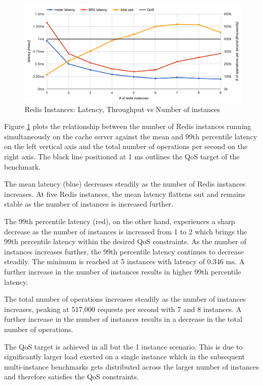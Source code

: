 \begin{figure}[h]
    \includegraphics[width=\textwidth]{./res/6_instances_latency_ops.png}
    \caption{Redis Instances: Latency, Throughput vs Number of instances}
    \label{fig:redis-instances-latency-ops}
\end{figure}

Figure \ref{fig:redis-instances-latency-ops} plots the relationship between the number of Redis instances running simultaneously on the cache server against the mean and 99th percentile latency on the left vertical axis and the total number of operations per second on the right axis. The black line positioned at 1 ms outlines the QoS target of the benchmark.

The mean latency (blue) decreases steadily as the number of Redis instances increases. At five Redis instances, the mean latency flattens out and remains stable as the number of instances is increased further.

The 99th percentile latency (red), on the other hand, experiences a sharp decrease as the number of instances is increased from 1 to 2 which brings the 99th percentile latency within the desired QoS constraints. As the number of instances increases further, the 99th percentile latency continues to decrease steadily. The minimum is reached at 5 instances with latency of 0.346 ms. A further increase in the number of instances results in higher 99th percentile latency.

The total number of operations increases steadily as the number of instances increases, peaking at 517,000 requests per second with 7 and 8 instances. A further increase in the number of instances results in a decrease in the total number of operations.

The QoS target is achieved in all but the 1 instance scenario. This is due to significantly larger load exerted on a single instance which in the subsequent multi-instance benchmarks gets distributed across the larger number of instances and therefore satisfies the QoS constraints.

